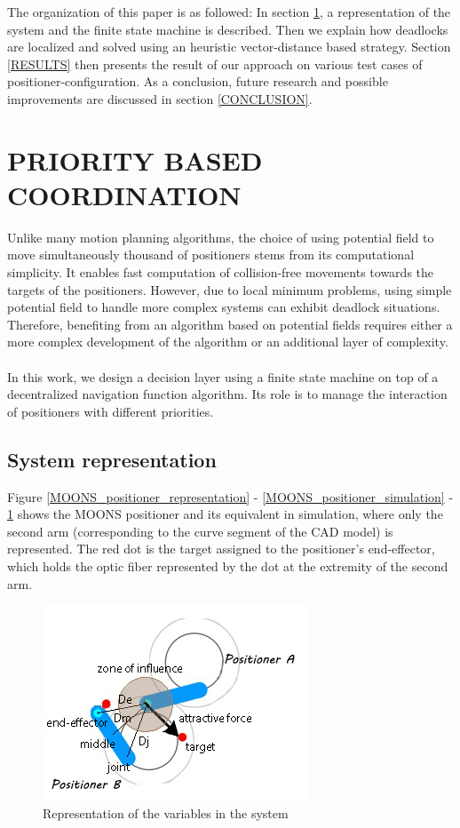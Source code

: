 \documentclass[]{spie}  %
\begin{document}
	The organization of this paper is as followed: In section \ref{PRIORITY BASED COORDINATION}, a representation of the system and the finite state machine is described. Then we explain how deadlocks are localized and solved using an heuristic vector-distance based strategy. Section \ref{RESULTS} then presents the result of our approach on various test cases of positioner-configuration. As a conclusion, future research and possible improvements are discussed in section \ref{CONCLUSION}.
	
	\section{PRIORITY BASED COORDINATION}
	\label{PRIORITY BASED COORDINATION}
	
	
	Unlike many motion planning algorithms, the choice of using potential field to move simultaneously thousand of positioners stems from its computational simplicity. It enables fast computation of collision-free movements towards the targets of the positioners. However, due to local minimum problems, using simple potential field to handle more complex systems can exhibit deadlock situations. Therefore, benefiting from an algorithm based on potential fields requires either a more complex development of the algorithm or an additional layer of complexity.\\\\
	In this work, we design a decision layer using a finite state machine on top of a decentralized navigation function algorithm. Its role is to manage the interaction of positioners with different priorities. 

	\subsection{System representation}	
		\label{Finite-state machine} 
	
	 Figure \ref{MOONS_positioner_representation} - \ref{MOONS_positioner_simulation} - \ref{sys_representation} shows the MOONS positioner and its equivalent in simulation, where only the second arm (corresponding to the curve segment of the CAD model) is represented. The red dot is the target assigned to the positioner's end-effector, which holds the optic fiber represented by the dot at the extremity of the second arm.
		\begin{figure}[H]
			\centering
			\includegraphics[scale=1]{images/system_representation.jpg}
			\caption{Representation of the variables in the system}
			\label{sys_representation}
		\end{figure}
	
\end{document}
